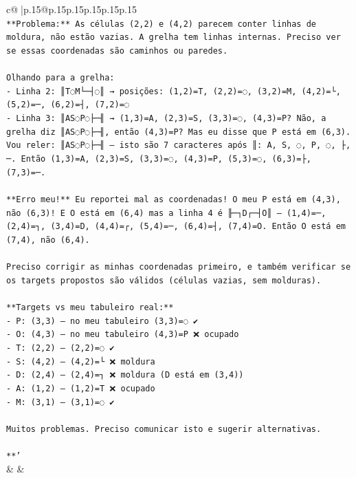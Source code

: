 \documentclass{article}
\begin{document}
{\begin{supertabular}{c@{$\;$}|p{.15\linewidth}@{}p{.15\linewidth}p{.15\linewidth}p{.15\linewidth}p{.15\linewidth}p{.15\linewidth}}
{{{\\ 
\texttt{**Problema:** As células (2,2) e (4,2) parecem conter linhas de moldura, não estão vazias. A grelha tem linhas internas. Preciso ver se essas coordenadas são caminhos ou paredes.} \\
\\ 
\texttt{Olhando para a grelha:} \\
\texttt{{-} Linha 2: ║T◌M└─┤◌║ → posições: (1,2)=T, (2,2)=◌, (3,2)=M, (4,2)=└, (5,2)=─, (6,2)=┤, (7,2)=◌} \\
\texttt{{-} Linha 3: ║AS◌P◌├─╢ → (1,3)=A, (2,3)=S, (3,3)=◌, (4,3)=P? Não, a grelha diz ║AS◌P◌├─╢, então (4,3)=P? Mas eu disse que P está em (6,3). Vou reler: ║AS◌P◌├─╢ — isto são 7 caracteres após ║: A, S, ◌, P, ◌, ├, ─. Então (1,3)=A, (2,3)=S, (3,3)=◌, (4,3)=P, (5,3)=◌, (6,3)=├, (7,3)=─. } \\
\\ 
\texttt{**Erro meu!** Eu reportei mal as coordenadas! O meu P está em (4,3), não (6,3)! E O está em (6,4) mas a linha 4 é ╟─┐D┌─┤O║ — (1,4)=─, (2,4)=┐, (3,4)=D, (4,4)=┌, (5,4)=─, (6,4)=┤, (7,4)=O. Então O está em (7,4), não (6,4).} \\
\\ 
\texttt{Preciso corrigir as minhas coordenadas primeiro, e também verificar se os targets propostos são válidos (células vazias, sem molduras).} \\
\\ 
\texttt{**Targets vs meu tabuleiro real:**} \\
\texttt{{-} P: (3,3) — no meu tabuleiro (3,3)=◌ ✔️} \\
\texttt{{-} O: (4,3) — no meu tabuleiro (4,3)=P ❌ ocupado} \\
\texttt{{-} T: (2,2) — (2,2)=◌ ✔️} \\
\texttt{{-} S: (4,2) — (4,2)=└ ❌ moldura} \\
\texttt{{-} D: (2,4) — (2,4)=┐ ❌ moldura (D está em (3,4))} \\
\texttt{{-} A: (1,2) — (1,2)=T ❌ ocupado} \\
\texttt{{-} M: (3,1) — (3,1)=◌ ✔️} \\
\\ 
\texttt{Muitos problemas. Preciso comunicar isto e sugerir alternativas.} \\
\\ 
\texttt{**'} \\
            }
        }
    }
    & & \\ \\


\end{supertabular}}
\end{document}
